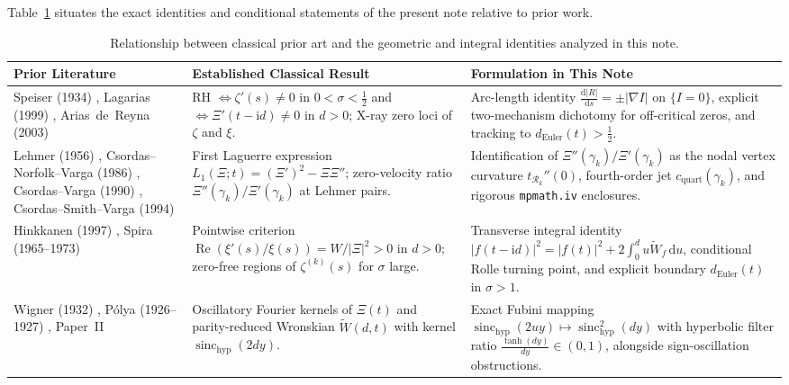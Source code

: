 \documentclass[11pt,a4paper,reqno]{amsart}
\theoremstyle{definition}
\theoremstyle{remark}
\numberwithin{equation}{section}
\newcommand{\dd}{\mathrm{d}}
\newcommand{\ii}{\mathrm{i}}
\newcommand{\Rea}{\operatorname{Re}}
\newcommand{\Wtil}{\widetilde{W}}
\newcommand{\sinch}{\operatorname{sinc}_{\mathrm{hyp}}}
\begin{document}
Table~\ref{tab:literature} situates the exact identities and conditional statements of the present note relative to prior work.

\begin{table}[htbp]
\centering
\caption{Relationship between classical prior art and the geometric and integral identities analyzed in this note.}\label{tab:literature}
\footnotesize
\begin{tabular}{p{} p{} p{}}
\toprule
\textbf{Prior Literature} & \textbf{Established Classical Result} & \textbf{Formulation in This Note} \\
\midrule
Speiser (1934) \cite{Speiser1934}, Lagarias (1999) \cite{Lagarias1999}, Arias~de~Reyna (2003) \cite{AriasDeReyna2003} & RH $\iff \zeta'(s) \neq 0$ in $0 < \sigma < \frac{1}{2}$ and $\iff \Xi'(t-\ii d) \neq 0$ in $d > 0$; X-ray zero loci of $\zeta$ and $\xi$. & Arc-length identity $\frac{\dd|R|}{\dd s} = \pm|\nabla I|$ on $\{I=0\}$, explicit two-mechanism dichotomy for off-critical zeros, and tracking to $d_{\mathrm{Euler}}(t) > \frac{1}{2}$. \\
\addlinespace[3pt]
Lehmer (1956) \cite{Lehmer1956}, Csordas--Norfolk--Varga (1986) \cite{Csordas1986}, Csordas--Varga (1990) \cite{CsordasVarga1990}, Csordas--Smith--Varga (1994) \cite{CsordasSmithVarga1994} & First Laguerre expression $L_1(\Xi;t) = (\Xi')^2 - \Xi\Xi''$; zero-velocity ratio $\Xi''(\gamma_k)/\Xi'(\gamma_k)$ at Lehmer pairs. & Identification of $\Xi''(\gamma_k)/\Xi'(\gamma_k)$ as the nodal vertex curvature $t_{\mathcal{R}_k}''(0)$, fourth-order jet $c_{\mathrm{quart}}(\gamma_k)$, and rigorous \texttt{mpmath.iv} enclosures. \\
\addlinespace[3pt]
Hinkkanen (1997) \cite{Hinkkanen1997}, Spira (1965--1973) \cite{Spira1965,Spira1968,Spira1973} & Pointwise criterion $\Rea(\xi'(s)/\xi(s)) = W/|\Xi|^2 > 0$ in $d > 0$; zero-free regions of $\zeta^{(k)}(s)$ for $\sigma$ large. & Transverse integral identity $|f(t-\ii d)|^2 = |f(t)|^2 + 2\int_0^d u\Wtil_f\,\dd u$, conditional Rolle turning point, and explicit boundary $d_{\mathrm{Euler}}(t)$ in $\sigma > 1$. \\
\addlinespace[3pt]
Wigner (1932) \cite{Wigner1932}, P\'olya (1926--1927) \cite{Polya1926,Polya1927}, Paper~II \cite{Missiaen2026Paper2} & Oscillatory Fourier kernels of $\Xi(t)$ and parity-reduced Wronskian $\Wtil(d,t)$ with kernel $\sinch(2d y)$. & Exact Fubini mapping $\sinch(2u y) \mapsto \sinch^2(d y)$ with hyperbolic filter ratio $\frac{\tanh(d y)}{d y} \in (0,1)$, alongside sign-oscillation obstructions. \\
\bottomrule
\end{tabular}
\end{table}
\end{document}
